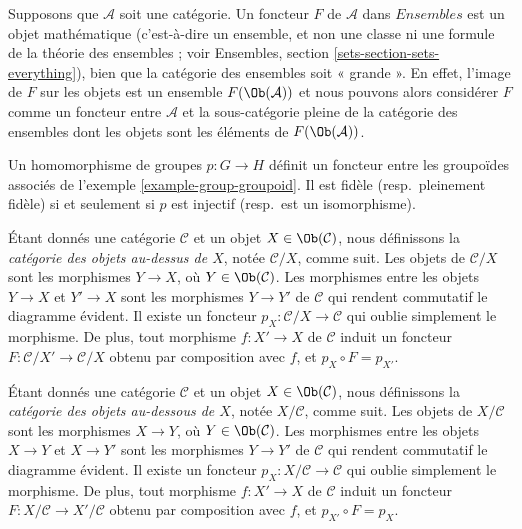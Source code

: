 \begin{remark}
\label{remark-functor-into-sets}
Supposons que $\mathcal{A}$ soit une catégorie.
Un foncteur $F$ de $\mathcal{A}$ dans $\textit{Ensembles}$
est un objet mathématique (c'est-à-dire un ensemble, et non une classe
ni une formule de la théorie des ensembles ; voir
Ensembles, section \ref{sets-section-sets-everything}),
bien que la catégorie des ensembles soit « grande ».
En effet, l'image de $F$ sur les objets est
un ensemble $F(\Ob(\mathcal{A}))$ et nous pouvons alors
considérer $F$ comme un foncteur entre
$\mathcal{A}$ et la sous-catégorie pleine
de la catégorie des ensembles dont les objets
sont les éléments de $F(\Ob(\mathcal{A}))$.
\end{remark}

\begin{example}
\label{example-group-homomorphism-functor}
Un homomorphisme de groupes $p : G\to H$ définit un foncteur entre
les groupoïdes associés de l'exemple \ref{example-group-groupoid}. Il est
fidèle (resp.\ pleinement fidèle) si et seulement si $p$ est injectif
(resp.\ est un isomorphisme).
\end{example}

\begin{example}
\label{example-category-over-X}
Étant donnés une catégorie $\mathcal{C}$ et un objet
$X\in \Ob(\mathcal{C})$, nous définissons la
{\it catégorie des objets au-dessus de $X$},
notée $\mathcal{C}/X$, comme suit.
Les objets de $\mathcal{C}/X$ sont les morphismes $Y\to X$,
où $Y\in \Ob(\mathcal{C})$. Les morphismes entre les objets
$Y\to X$ et $Y'\to X$ sont les morphismes $Y\to Y'$ de $\mathcal{C}$
qui rendent commutatif le diagramme évident. Il existe un foncteur
$p_X : \mathcal{C}/X\to \mathcal{C}$ qui oublie simplement le morphisme.
De plus, tout morphisme $f : X'\to X$ de $\mathcal{C}$ induit un foncteur
$F : \mathcal{C}/X' \to \mathcal{C}/X$ obtenu par composition avec $f$,
et $p_X\circ F = p_{X'}$.
\end{example}

\begin{example}
\label{example-category-under-X}
Étant donnés une catégorie $\mathcal{C}$ et un objet
$X\in \Ob(\mathcal{C})$, nous définissons la
{\it catégorie des objets au-dessous de $X$},
notée $X/\mathcal{C}$, comme suit.
Les objets de $X/\mathcal{C}$ sont les morphismes $X\to Y$,
où $Y\in \Ob(\mathcal{C})$. Les morphismes entre les objets
$X\to Y$ et $X\to Y'$ sont les morphismes $Y\to Y'$ de $\mathcal{C}$
qui rendent commutatif le diagramme évident. Il existe un foncteur
$p_X : X/\mathcal{C}\to \mathcal{C}$ qui oublie simplement le morphisme.
De plus, tout morphisme $f : X'\to X$ de $\mathcal{C}$ induit un foncteur
$F : X/\mathcal{C} \to X'/\mathcal{C}$
obtenu par composition avec $f$,
et $p_{X'}\circ F = p_X$.
\end{example}




